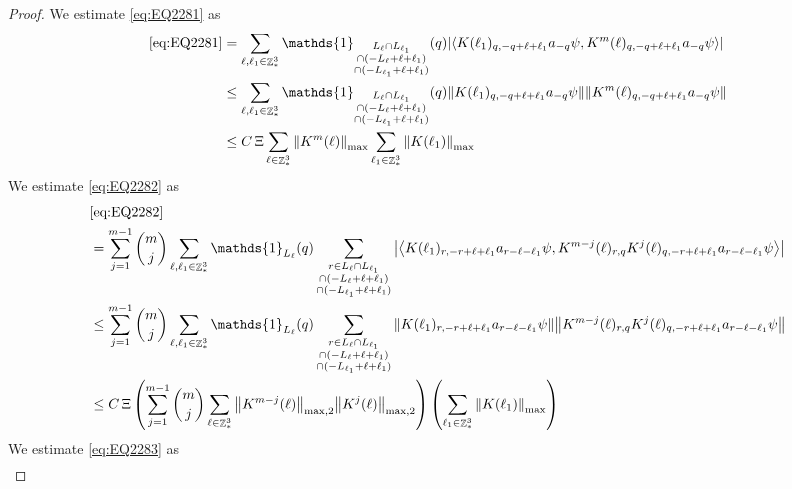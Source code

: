 \documentclass[sn-mathphys, Numbered ,a4paper]{sn-jnl}%
\DeclareMathOperator{\Z}{\mathbb{Z}}
\newcommand{\eva}[1]{\left\langle #1 \right\rangle}
\theoremstyle{plain}
\theoremstyle{definition}
\theoremstyle{remark}
\theoremstyle{plain}
\theoremstyle{definition}
\theoremstyle{remark}
\begin{document}
\begin{proof}
We estimate \eqref{eq:EQ2281} as 
\begin{align}
	\eqref{eq:EQ2281}
	&= \sum\limits_{\ell, \ell_1\in \Z^3_*} \mathds{1}_{\substack{L_{\ell}\cap L_{\ell_1}\\\cap (-L_{\ell}+\ell+\ell_1) \\ \cap (-L_{\ell_1}+\ell+\ell_1)}}(q) \abs{\eva{ K(\ell_1)_{q,-q+\ell+\ell_1} a_{-q} \psi, K^m(\ell)_{q,-q+\ell+\ell_1} a_{-q} \psi }}\nonumber\\
	&\leq \sum\limits_{\ell, \ell_1\in \Z^3_*} \mathds{1}_{\substack{L_{\ell}\cap L_{\ell_1}\\\cap (-L_{\ell}+\ell+\ell_1) \\ \cap (-L_{\ell_1}+\ell+\ell_1)}}(q) \norm{ K(\ell_1)_{q,-q+\ell+\ell_1} a_{-q} \psi}\norm{ K^m(\ell)_{q,-q+\ell+\ell_1} a_{-q} \psi }\nonumber\\
	&\leq C\,\Xi\sum\limits_{\ell \in \Z^3_*} \norm{K^m(\ell)}_{\mathrm{max}} \sum\limits_{\ell_1 \in \Z^3_*} \norm{K(\ell_1)}_{\mathrm{max}}  \label{eq:estEQ2281}
\end{align}
We estimate \eqref{eq:EQ2282} as
\begin{align}
	& \eqref{eq:EQ2282}\nonumber\\
	&= \sum\limits_{j=1}^{m-1} {{m}\choose j} \sum\limits_{\ell, \ell_1\in \Z^3_*}\mathds{1}_{L_{\ell}}(q) \sum\limits_{\substack{r\in L_{\ell} \cap L_{\ell_1}\\\cap (-L_{\ell}+\ell+\ell_1) \\ \cap (-L_{\ell_1}+\ell+\ell_1)}}  \abs{\eva{ K(\ell_1)_{r,-r+\ell+\ell_1} a_{r-\ell-\ell_1} \psi, K^{m-j}(\ell)_{r,q} K^j(\ell)_{q,-r+\ell+\ell_1} a_{r-\ell-\ell_1} \psi }}\nonumber\\
	&\leq \sum\limits_{j=1}^{m-1} {{m}\choose j} \sum\limits_{\ell, \ell_1\in \Z^3_*}\mathds{1}_{L_{\ell}}(q) \sum\limits_{\substack{r\in L_{\ell} \cap L_{\ell_1}\\\cap (-L_{\ell}+\ell+\ell_1) \\ \cap (-L_{\ell_1}+\ell+\ell_1)}}  \norm{ K(\ell_1)_{r,-r+\ell+\ell_1} a_{r-\ell-\ell_1} \psi} \norm{ K^{m-j}(\ell)_{r,q} K^j(\ell)_{q,-r+\ell+\ell_1} a_{r-\ell-\ell_1} \psi} \nonumber\\
	&\leq C\,\Xi \left(\sum\limits_{j=1}^{m-1} {{m}\choose j} \sum\limits_{ \ell\in \Z^3_*} \norm{K^{m-j}(\ell)}_{\mathrm{max,2}} \norm{K^j(\ell)}_{\mathrm{max,2}}\right) \left(\sum\limits_{ \ell_1\in \Z^3_*}\norm{ K(\ell_1)}_{\mathrm{max}} \right)\label{eq:estEQ2282}
\end{align}
We estimate \eqref{eq:EQ2283} as
\begin{align}

\end{align}
\end{proof}
\end{document}
